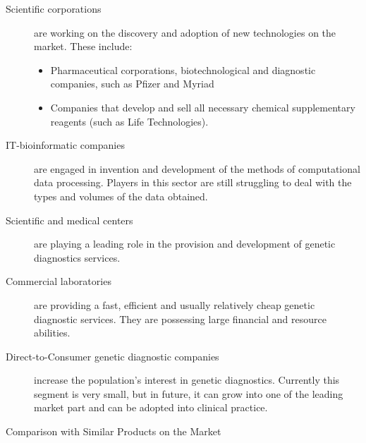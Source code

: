 \begin{description}
  \item [Scientific corporations] are working on the discovery and adoption of new technologies on the market. These include:

    \begin{itemize}
      \item Pharmaceutical corporations, biotechnological and diagnostic companies, such as Pfizer and Myriad
      \item Companies that develop and sell all necessary chemical supplementary reagents (such as Life Technologies).
    \end{itemize}

  \item [IT-bioinformatic companies] are engaged in invention and development of the methods of computational data processing. Players in this sector are still struggling to deal with the types and volumes of the data obtained.

  \item [Scientific and medical centers] are playing a leading role in the provision and development of genetic diagnostics services.

  \item [Commercial laboratories] are providing a fast, efficient and usually relatively cheap genetic diagnostic services. They are possessing large financial and resource abilities.

  \item [Direct-to-Consumer genetic diagnostic companies] increase the population's interest in genetic diagnostics. Currently this segment is very small, but in future, it can grow into one of the leading market part and can be adopted into clinical practice.

\end{description}

\begin{table}[H] \centering
  \caption{Comparison with Similar Products on the Market}
  
\end{table}
